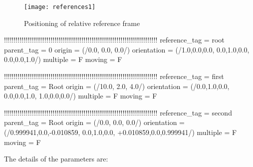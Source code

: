 \begin{figure}
\centering
\texttt{[image: references1]}
\caption{Positioning of relative reference frame}
\label{fig:references1}
\end{figure}

\begin{inputfile}[frame=single, caption={references\_static.in}, label={file:references_static.in}]
!!!!!!!!!!!!!!!!!!!!!!!!!!!!!!!!!!!!!!!!!!!!!!!!!!!!!!!!!!!!!!!!!!!!!!!!!!!!!!!
reference_tag = root
parent_tag = 0
origin = (/0.0, 0.0, 0.0/)
orientation = (/1.0,0.0,0.0, 0.0,1.0,0.0, 0.0,0.0,1.0/)
multiple = F
moving = F

!!!!!!!!!!!!!!!!!!!!!!!!!!!!!!!!!!!!!!!!!!!!!!!!!!!!!!!!!!!!!!!!!!!!!!!!!!!!!!!
reference_tag = first
parent_tag = Root
origin = (/10.0, 2.0, 4.0/)
orientation = (/0.0,1.0,0.0, 0.0,0.0,1.0, 1.0,0.0,0.0/)
multiple = F
moving = F

!!!!!!!!!!!!!!!!!!!!!!!!!!!!!!!!!!!!!!!!!!!!!!!!!!!!!!!!!!!!!!!!!!!!!!!!!!!!!!!
reference_tag = second
parent_tag = Root
origin = (/0.0, 0.0, 0.0/)
orientation = (/0.999941,0.0,-0.010859, 0.0,1.0,0.0, +0.010859,0.0,0.999941/)
multiple = F
moving = F
\end{inputfile}
The details of the parameters are:
